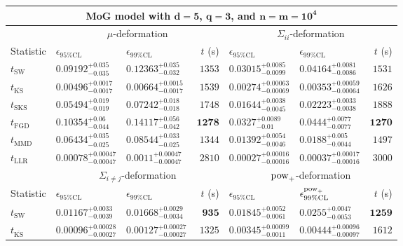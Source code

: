 \begin{tabular}{l|llr|llr}
	\toprule
	\multicolumn{7}{c}{{\bf MoG model with $\mathbf{d=5}$, $\mathbf{q=3}$, and $\mathbf{n=m=10^{4}}$}} \\
	\toprule
	\multicolumn{1}{c}{} & \multicolumn{3}{c}{$\mu$-deformation} & \multicolumn{3}{c}{$\Sigma_{ii}$-deformation} \\
	Statistic & $\epsilon_{95\%\mathrm{CL}}$ & $\epsilon_{99\%\mathrm    {CL}}$ & $t$ (s) & $\epsilon_{95\%\mathrm{CL}}$ & $\epsilon_{99\%\mathrm{CL}}$ & $t$ (s) \\
	\midrule
	$t_{\mathrm{SW}}$ & $0.09192_{-0.035}^{+0.035}$ & $0.12363_{-0.032}^{+0.035}$ & $1353$ & $0.03015_{-0.0099}^{+0.0085}$ & $0.04164_{-0.0086}^{+0.0081}$ & $1531$ \\
	$t_{\overline{\mathrm{KS}}}$ & ${\mathbf{0.00496_{-0.0017}^{+0.0017}}}$ & ${\mathbf{0.00664_{-0.0017}^{+0.0015}}}$ & $1539$ & ${\mathbf{0.00274_{-0.00069}^{+0.00063}}}$ & ${\mathbf{0.00353_{-0.00064}^{+0.00059}}}$ & $1626$ \\
	$t_{\mathrm{SKS}}$ & $0.05494_{-0.019}^{+0.019}$ & $0.07242_{-0.018}^{+0.018}$ & $1748$ & $0.01644_{-0.0045}^{+0.0038}$ & $0.02223_{-0.0038}^{+0.0033}$ & $1888$ \\
	$t_{\mathrm{FGD}}$ & $0.10354_{-0.044}^{+0.06}$ & $0.14117_{-0.042}^{+0.056}$ & ${\mathbf{1278}}$ & $0.0327_{-0.01}^{+0.0089}$ & $0.0444_{-0.0077}^{+0.0077}$ & ${\mathbf{1270}}$ \\
	$t_{\mathrm{MMD}}$ & $0.06434_{-0.025}^{+0.035}$ & $0.08544_{-0.025}^{+0.033}$ & $1344$ & $0.01392_{-0.0046}^{+0.0054}$ & $0.0188_{-0.0044}^{+0.005}$ & $1497$ \\
	$t_{\mathrm{LLR}}$ & $0.00078_{-0.00047}^{+0.00047}$ & $0.0011_{-0.00047}^{+0.00047}$ & $2810$ & $0.00027_{-0.00016}^{+0.00016}$ & $0.00037_{-0.00016}^{+0.00017}$ & $3000$ \\
	\toprule
	\multicolumn{1}{c}{} & \multicolumn{3}{c}{$\Sigma_{i\neq j}$-deformation} & \multicolumn{3}{c}{$\rm{pow}_{+}$-deformation} \\
	Statistic & $\epsilon_{95\%\mathrm{CL}}$ & $\epsilon_{99\%\mathrm{CL}}$ & $t$ (s) & $\epsilon_{95\%\mathrm{CL}}$ & $\epsilon^{\rm   {pow}_{+}}_{99\%\mathrm{CL}}$ & $t$ (s) \\
	\midrule
	$t_{\mathrm{SW}}$ & $0.01167_{-0.0039}^{+0.0033}$ & $0.01668_{-0.0034}^{+0.0029}$ & ${\mathbf{935}}$ & $0.01845_{-0.0061}^{+0.0052}$ & $0.0255_{-0.0053}^{+0.0047}$ & ${\mathbf{1259}}$ \\
	$t_{\overline{\mathrm{KS}}}$ & ${\mathbf{0.00096_{-0.00027}^{+0.00028}}}$ & ${\mathbf{0.00127_{-0.00027}^{+0.00027}}}$ & $1325$ & ${\mathbf{0.00345_{-0.0011}^{+0.00099}}}$ & ${\mathbf{0.00444_{-0.00097}^{+0.00096}}}$ & $1612$ \\

\end{tabular}
